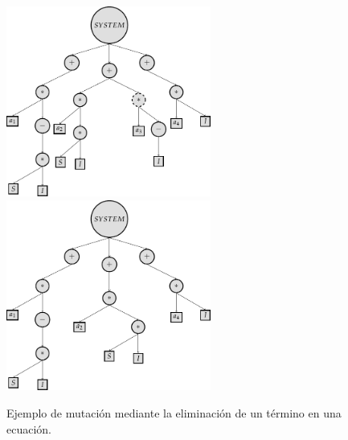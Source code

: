 \begin{center}
    \begin{figure}[h]
        \centering
        \includegraphics[width=0.6\textwidth]{"figures/mutation_sir_1.pdf"}
        \qquad
        \includegraphics[width=0.6\textwidth]{"figures/mutation_sir_2.pdf"}
        \caption{Ejemplo de mutación mediante la eliminación de un término en una ecuación.}
        \label{tikzpicture:mutation_sir}
    \end{figure}

\end{center}


